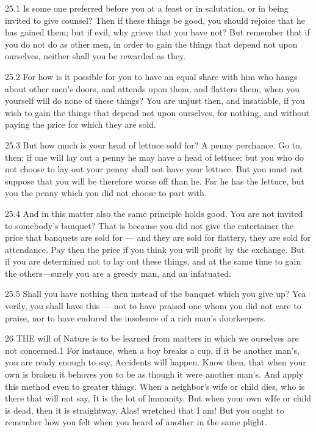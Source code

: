    25.1   Is  some one preferred before you at a feast or in salutation, or in being invited to give counsel? Then if these things be good, you should rejoice that he has gained them;  but if evil, why grieve that you have not? But remember  that if you do not do as other men, in order to gain the things that depend not upon ourselves, neither shall you be rewarded as they.

   25.2   For how is it possible for you to have an equal share with him who hangs about other men’s doors, and attends upon them, and flatters them, when you yourself will do none of these things? You are unjust then, and insatiable, if you wish to gain the things that depend not upon ourselves, for nothing, and without paying the price for which they are sold.

   25.3   But how much is your head of lettuce sold for? A penny perchance. Go to, then:  if one will lay out a penny he may have a head of lettuce; but you who do not choose to lay out your penny shall not have your lettuce. But you must not suppose that you will be therefore worse off than he. For he has the lettuce, but you the penny which you did not choose to part with.

   25.4    And in this matter also the same principle holds good. You are not invited to somebody’s banquet? That is because you did not give the entertainer the price that banquets are sold for — and they are sold for flattery, they are sold for attendance.  Pay then the price if you think you will profit by the exchange. But if you are determined not to lay out these things, and at the same time to gain the others—surely you are a greedy man, and an infatuated.

   25.5   Shall you have nothing then instead of the banquet which you give up? Yea verily, you shall have this — not to have praised one whom you did not care to praise, nor to have endured the insolence of a rich man’s doorkeepers.

   26   THE will of Nature is to be learned from matters in which we ourselves are not concerned.1  For instance, when a boy breaks a cup, if it be another man’s, you are ready enough to say, Accidents will happen. Know then, that  when your own is broken it behoves you to be as though it were another man’s. And apply this method even to greater things. When a neighbor’s wife or child dies, who is there that will not say, It is the lot of humanity. But when your own wIfe or child is dead, then it is straightway, Alas! wretched that I am! But you ought to remember how you felt when you heard of another in the same plight.

